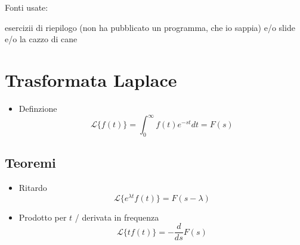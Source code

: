 \documentclass[11pt]{article}
\date{\today}
\title{}
\begin{document}
\tableofcontents

Fonti usate: 

esercizii di riepilogo (non ha pubblicato un programma, che io sappia)
e/o slide e/o la cazzo di cane

\section{Trasformata Laplace}
\label{sec:org03f9a32}
\begin{itemize}
\item Definzione
\[\mathcal{L}\{f(t)\} = \int_{0}^{\infty} f(t) e^{-st} dt = F(s)\]
\end{itemize}

\subsection{Teoremi}
\label{sec:orgbac12db}
\begin{itemize}
\item Ritardo
\[\mathcal{L}\{e^{\lambda t}f(t)\} = F(s-\lambda)\]
\item Prodotto per \(t\) / derivata in frequenza
\[\mathcal{L}\{t f(t)\} = -\frac{d}{ds} F(s)\]
\end{itemize}
\end{document}
